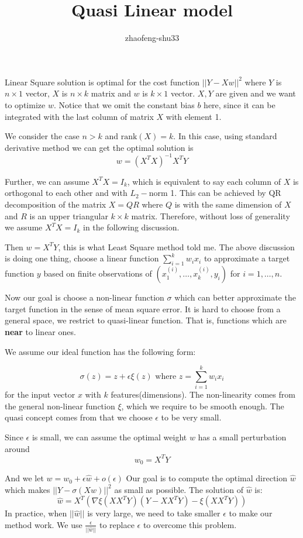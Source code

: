 \documentclass{article}
\title{Quasi Linear model}
\author{zhaofeng-shu33}
\begin{document}
	\maketitle
Linear Square solution is optimal for the cost function $||Y-Xw||^2$ where $Y$ is $n\times 1$ vector,
$X$ is $n\times k$ matrix and $w$ is $k\times 1$ vector. $X,Y$ are given and we want to optimize $w$.
Notice that we omit the constant bias $b$ here, since it can be integrated with the last column of matrix $X$ with element 1.

We consider the case $n > k$ and $\textrm{rank}(X) = k$. In this case, using standard derivative method we can get
the optimal solution is
$$
w = (X^TX)^{-1} X^T Y
$$

Further, we can assume $X^TX=I_k$, which is equivalent to say each column of $X$ is orthogonal to each other and with $L_2-$norm 1.
This can be achieved by QR decomposition of the matrix $X=QR$ where $Q$ is with the same dimension of $X$ and $R$ is an upper triangular 
$k\times k$ matrix. Therefore, without loss of generality we assume $X^TX=I_k$ in the following discussion.

Then $w=X^T Y$, this is what Least Square method told me. The above discussion is doing one thing, choose a linear function $\sum_{i=1}^k w_i x_i$
to approximate a target function $y$ based on finite observations of $(x^{(i)}_1,\dots, x^{(i)}_k, y_i)$ for $i=1,\dots, n$.

Now our goal is choose a non-linear function $\sigma$ which can better approximate the target function in the sense of mean square error.
It is hard to choose from a general space, we restrict to quasi-linear function. That is, functions which are \textbf{near} to 
linear ones.

We assume our ideal function has the following form:

$$
\sigma(z) = z + \epsilon \xi(z) \textrm{ where } z = \sum_{i=1}^k w_i x_i
$$
for the input vector $x$ with $k$ features(dimensions).
The non-linearity comes from the general non-linear function $\xi$, which we require to be smooth enough.
The quasi concept comes from that we choose $\epsilon$ to be very small.

Since $\epsilon$ is small, we can assume the optimal weight $w$ has a small perturbation around
\begin{equation}\label{eq:W_0}
w_0 = X^T Y
\end{equation}


And we let $w=w_0 + \epsilon \hat{w} + o(\epsilon)$ Our goal is to compute the optimal direction $\hat{w}$ which makes
$||Y-\sigma(Xw)||^2$ as small as possible.
The solution of $\hat{w}$ is:
\begin{equation}\label{eq:W_hat}
\hat{w} = X^T\left(\nabla \xi(XX^TY)(Y-XX^TY) - \xi(XX^TY)
\right)
\end{equation}
In practice, when $||\hat{w}||$ is very large, we need to take smaller $\epsilon$ to make our method work. We use 
$\frac{\epsilon}{||\hat{w}||} $ to replace $\epsilon$ to overcome this problem.
\end{document}
